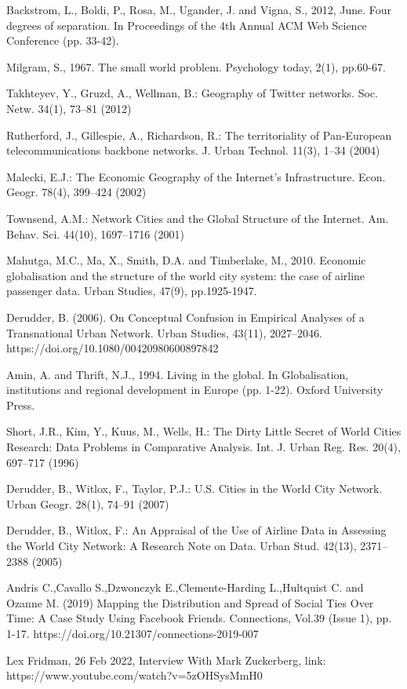 \documentclass[12pt]{article}
\begin{document}
Backstrom, L., Boldi, P., Rosa, M., Ugander, J. and Vigna, S., 2012, June. Four degrees of separation. In Proceedings of the 4th Annual ACM Web Science Conference (pp. 33-42).

Milgram, S., 1967. The small world problem. Psychology today, 2(1), pp.60-67.

Takhteyev, Y., Gruzd, A., Wellman, B.: Geography of Twitter networks. Soc. Netw.
34(1), 73–81 (2012)

Rutherford, J., Gillespie, A., Richardson, R.: The territoriality of Pan-European
telecommunications backbone networks. J. Urban Technol. 11(3), 1–34 (2004)

Malecki, E.J.: The Economic Geography of the Internet’s Infrastructure. Econ.
Geogr. 78(4), 399–424 (2002)

Townsend, A.M.: Network Cities and the Global Structure of the Internet. Am.
Behav. Sci. 44(10), 1697–1716 (2001)

Mahutga, M.C., Ma, X., Smith, D.A. and Timberlake, M., 2010. Economic globalisation and the structure of the world city system: the case of airline passenger data. Urban Studies, 47(9), pp.1925-1947.

Derudder, B. (2006). On Conceptual Confusion in Empirical Analyses of a Transnational Urban Network. Urban Studies, 43(11), 2027–2046. https://doi.org/10.1080/00420980600897842

Amin, A. and Thrift, N.J., 1994. Living in the global. In Globalisation, institutions and regional development in Europe (pp. 1-22). Oxford University Press.

Short, J.R., Kim, Y., Kuus, M., Wells, H.: The Dirty Little Secret of World Cities
Research: Data Problems in Comparative Analysis. Int. J. Urban Reg. Res. 20(4),
697–717 (1996)

Derudder, B., Witlox, F., Taylor, P.J.: U.S. Cities in the World City Network.
Urban Geogr. 28(1), 74–91 (2007)

Derudder, B., Witlox, F.: An Appraisal of the Use of Airline Data in Assessing the
World City Network: A Research Note on Data. Urban Stud. 42(13), 2371–2388
(2005)

Andris C.,Cavallo S.,Dzwonczyk E.,Clemente-Harding L.,Hultquist C. and Ozanne M. (2019) Mapping the Distribution and Spread of Social Ties Over Time: A Case Study Using Facebook Friends. Connections, Vol.39 (Issue 1), pp. 1-17. https://doi.org/10.21307/connections-2019-007

Lex Fridman, 26 Feb 2022, Interview With Mark Zuckerberg, link: https://www.youtube.com/watch?v=5zOHSysMmH0
\end{document}

